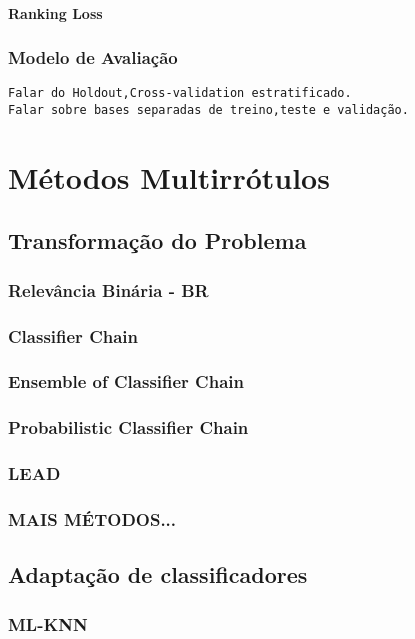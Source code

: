 \subsubsection{Ranking Loss}
\subsection{Modelo de Avaliação}
\label{sec:modelav}

\begin{verbatim}
Falar do Holdout,Cross-validation estratificado.
Falar sobre bases separadas de treino,teste e validação.
\end{verbatim}

\chapter{Métodos Multirrótulos}
\section{Transformação do Problema}
\subsection{Relevância Binária - BR}
\subsection{Classifier Chain}
\subsection{Ensemble of Classifier Chain}
\subsection{Probabilistic Classifier Chain}
\subsection{LEAD}
\subsection{MAIS MÉTODOS...}

\section{Adaptação de classificadores}
\subsection{ML-KNN}
